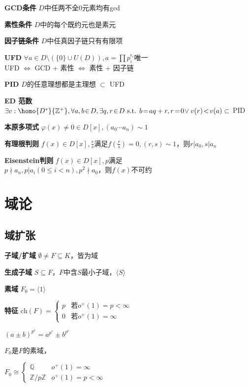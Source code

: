 \documentclass[b4paper, 10pt]{ctexart}
\newcommand*{\setZ}{\mathbb{Z}}
\newcommand*{\setQ}{\mathbb{Q}}
\newcommand*{\st}{\text{ s.t. }}
\renewcommand*{\iff}{\Leftrightarrow}
\renewcommand*{\leq}{\leqslant}
\newcommand*{\genfield}[1]{\langle #1 \rangle}
\newcommand*{\ch}[1]{\text{ch}(#1)}
\begin{document}
\begin{multicols}{3}
    \textbf{GCD条件} $D$中任两不全0元素均有gcd

    \textbf{素性条件} $D$中的每个既约元也是素元

    \textbf{因子链条件} $D$中任真因子链只有有限项

    \textbf{UFD} $\forall a \!\in\! D \setminus (\{ 0 \} \!\cup\! U(D)), a \! = \! \prod p_i^{\epsilon_i}$唯一\\
    UFD $\iff$ GCD + 素性 $\iff$ 素性 + 因子链

    \textbf{PID} $D$的任意理想都是主理想 $\subset$ UFD

    \textbf{ED 范数} $\exists v: \homo{D^*}{\setZ^+}, \forall a, b \!\in\! D, \exists q, r \!\in\! D \st b \! = \! aq + r, r \! = \! 0 \!\vee v(r) \!<\! v(a) \subset$ PID

    \textbf{本原多项式} $\varphi(x) \!\ne\! 0 \!\in\! D[x], (a_0 \cdots a_n) \sim 1$

    \textbf{有理根判则} $f(x) \in D[x], \frac{r}{s}$满足$f(\frac{r}{s}) = 0, (r, s) \sim 1$，则$r | a_0, s | a_n$

    \textbf{Eisenstein判则} $f(x) \!\in\! D[x], p$满足\\
    $p \!\nmid\! a_n, p | a_i (0 \!\leq\! i \!<\! n), p^2 \nmid a_0$，则$f(x)$不可约

    \section{域论}

    \subsection{域扩张}

    \textbf{子域/扩域} $\emptyset \ne F \subseteq K$，皆为域

    \textbf{生成子域} $S \subseteq F$，$F$中含$S$最小子域，$\genfield{S}$

    \textbf{素域} $F_0 = \genfield{1}$

    \textbf{特征} $\ch{F} = \begin{cases}
            p & \text{若}o^+(1) = p < \infty \\
            0 & \text{若}o^+(1) = \infty
        \end{cases}$

    $(a \pm b)^{p^e} = a^{p^e} \pm b^{p^e}$

    \begin{theorem}[素域同构]
        $F_0$是$F$的素域，

        $F_0 \cong \begin{cases}
                \setQ        & o^+(1) = \infty     \\
                \setZ/p\setZ & o^+(1) = p < \infty
            \end{cases}$
    \end{theorem}


\end{multicols}
\end{document}
